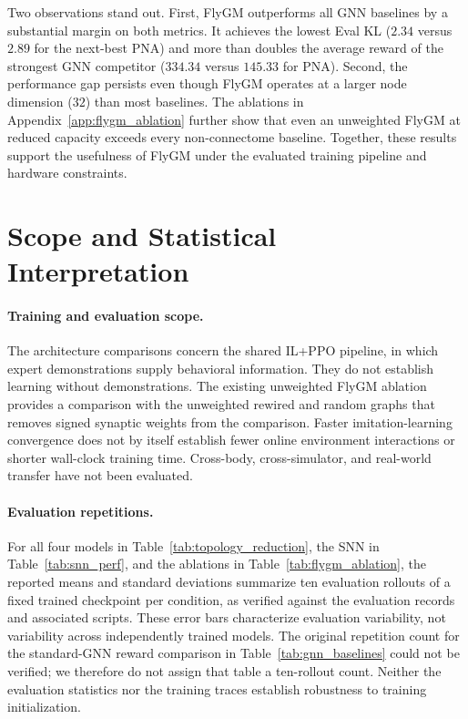 \documentclass[a4paper]{easychair}
\begin{document}
Two observations stand out. First, FlyGM outperforms all GNN baselines by a substantial margin on both metrics. It achieves the lowest Eval KL ($2.34$ versus $2.89$ for the next-best PNA) and more than doubles the average reward of the strongest GNN competitor ($334.34$ versus $145.33$ for PNA). Second, the performance gap persists even though FlyGM operates at a larger node dimension ($32$) than most baselines. The ablations in Appendix~\ref{app:flygm_ablation} further show that even an unweighted FlyGM at reduced capacity exceeds every non-connectome baseline. Together, these results support the usefulness of FlyGM under the evaluated training pipeline and hardware constraints.

% 

\section{Scope and Statistical Interpretation}
\label{app:scope_stats}

\paragraph{Training and evaluation scope.}
The architecture comparisons concern the shared IL+PPO pipeline, in which expert demonstrations supply behavioral information. They do not establish learning without demonstrations. The existing unweighted FlyGM ablation provides a comparison with the unweighted rewired and random graphs that removes signed synaptic weights from the comparison. Faster imitation-learning convergence does not by itself establish fewer online environment interactions or shorter wall-clock training time. Cross-body, cross-simulator, and real-world transfer have not been evaluated.

\paragraph{Evaluation repetitions.}
For all four models in Table~\ref{tab:topology_reduction}, the SNN in Table~\ref{tab:snn_perf}, and the ablations in Table~\ref{tab:flygm_ablation}, the reported means and standard deviations summarize ten evaluation rollouts of a fixed trained checkpoint per condition, as verified against the evaluation records and associated scripts. These error bars characterize evaluation variability, not variability across independently trained models. The original repetition count for the standard-GNN reward comparison in Table~\ref{tab:gnn_baselines} could not be verified; we therefore do not assign that table a ten-rollout count. Neither the evaluation statistics nor the training traces establish robustness to training initialization.
\end{document}
